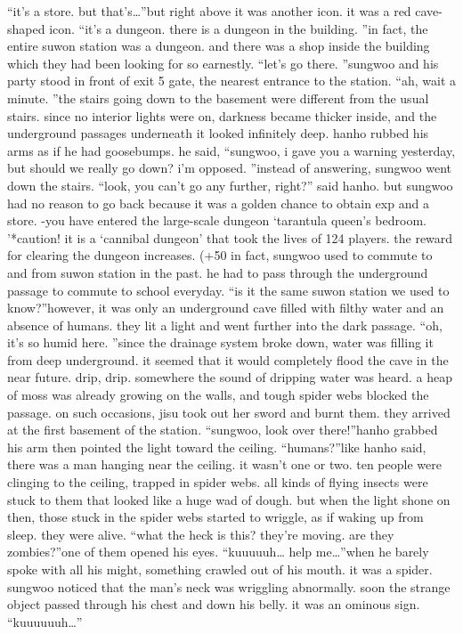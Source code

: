 “it’s a store.
 but that’s…”but right above it was another icon.
 it was a red cave-shaped icon.
“it’s a dungeon.
 there is a dungeon in the building.
”in fact, the entire suwon station was a dungeon.
and there was a shop inside the building which they had been looking for so earnestly.
“let’s go there.
”sungwoo and his party stood in front of exit 5 gate, the nearest entrance to the station.
“ah, wait a minute.
”the stairs going down to the basement were different from the usual stairs.
 since no interior lights were on, darkness became thicker inside, and the underground passages underneath it looked infinitely deep.
hanho rubbed his arms as if he had goosebumps.
he said, “sungwoo, i gave you a warning yesterday, but should we really go down? i’m opposed.
”instead of answering, sungwoo went down the stairs.
“look, you can’t go any further, right?” said hanho.
but sungwoo had no reason to go back because it was a golden chance to obtain exp and a store.
-you have entered the large-scale dungeon ‘tarantula queen’s bedroom.
’*caution! it is a ‘cannibal dungeon’ that took the lives of 124 players.
 the reward for clearing the dungeon increases.
 (+50%
in fact, sungwoo used to commute to and from suwon station in the past.
 he had to pass through the underground passage to commute to school everyday.
“is it the same suwon station we used to know?”however, it was only an underground cave filled with filthy water and an absence of humans.
 they lit a light and went further into the dark passage.
“oh, it’s so humid here.
”since the drainage system broke down, water was filling it from deep underground.
 it seemed that it would completely flood the cave in the near future.
drip, drip.
somewhere the sound of dripping water was heard.
 a heap of moss was already growing on the walls, and tough spider webs blocked the passage.
 on such occasions, jisu took out her sword and burnt them.
they arrived at the first basement of the station.
“sungwoo, look over there!”hanho grabbed his arm then pointed the light toward the ceiling.
“humans?”like hanho said, there was a man hanging near the ceiling.
 it wasn’t one or two.
ten people were clinging to the ceiling, trapped in spider webs.
 all kinds of flying insects were stuck to them that looked like a huge wad of dough.
but when the light shone on then, those stuck in the spider webs started to wriggle, as if waking up from sleep.
they were alive.
“what the heck is this? they’re moving.
 are they zombies?”one of them opened his eyes.
“kuuuuuh… help me…”when he barely spoke with all his might, something crawled out of his mouth.
 it was a spider.
sungwoo noticed that the man’s neck was wriggling abnormally.
 soon the strange object passed through his chest and down his belly.
 it was an ominous sign.
“kuuuuuuh…”


